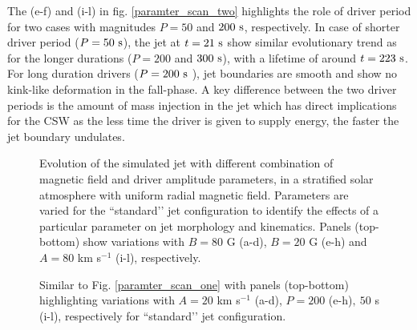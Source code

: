 \documentclass[12pt]{ociamthesis}
\newcommand{\fref}[1]{Fig. \eqref{#1}}
\begin{document}
The (e-f) and (i-l) in fig. \eqref{paramter_scan_two} highlights the role of driver period for two cases with magnitudes $P = 50$ and $200~\rm{s}$, respectively. In case of shorter driver period ($P = 50 ~\rm{s}$), the jet at $t = 21~\rm{s}$ show similar evolutionary trend as for the longer durations ($P = 200$ and $300~\rm{s}$), with a lifetime of around $t = 223~\rm{s}$. For long duration drivers ($P = 200~\rm{s}$ ), jet boundaries are smooth and show no kink-like deformation in the fall-phase. A key difference between the two driver periods is the amount of mass injection in the jet which has direct implications for the CSW as the less time the driver is given to supply energy, the faster the jet boundary undulates.  
\begin{figure}
\captionsetup[subfigure]{labelformat=empty}
\centering
{} 
\caption{Evolution of the simulated jet with different combination of magnetic field and driver amplitude parameters, in a stratified solar atmosphere with uniform radial magnetic field. Parameters are varied for the ``standard’’ jet configuration to identify the effects of a particular parameter on jet morphology and kinematics. Panels (top-bottom) show variations with $B = 80$ G (a-d), $B = 20$ G  (e-h) and $A = 80$ km s$^{-1}$ (i-l), respectively.}
\label{paramter_scan_one}
\end{figure}
\begin{figure}
\captionsetup[subfigure]{labelformat=empty}
\centering
{} 
\caption{Similar to \fref{paramter_scan_one} with panels (top-bottom) highlighting variations with $A = 20$ km s$^{-1}$ (a-d), $P = 200$ (e-h)$,~50$ s (i-l), respectively for ``standard’’ jet configuration.}
\label{paramter_scan_two}
\end{figure}
\end{document}
